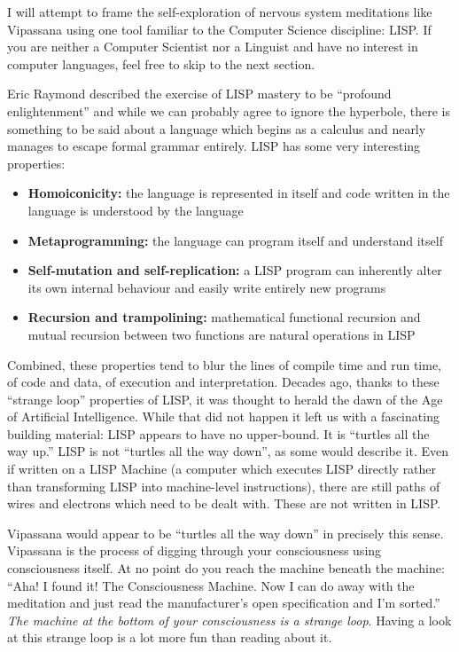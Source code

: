 \documentclass{article}
\begin{document}
I will attempt to frame the self-exploration of nervous system meditations like Vipassana using one tool familiar to the Computer Science discipline: LISP. If you are neither a Computer Scientist nor a Linguist and have no interest in computer languages, feel free to skip to the next section.

Eric Raymond described the exercise of LISP mastery to be ``profound enlightenment'' \cite{hackerhowto} and while we can probably agree to ignore the hyperbole, there is something to be said about a language which begins as a calculus and nearly manages to escape formal grammar entirely. LISP has some very interesting properties:

\begin{itemize}
\item \textbf{Homoiconicity:} the language is represented in itself and code written in the language is understood by the language
\item \textbf{Metaprogramming:} the language can program itself and understand itself
\item \textbf{Self-mutation and self-replication:} a LISP program can inherently alter its own internal behaviour and easily write entirely new programs
\item \textbf{Recursion and trampolining:} mathematical functional recursion and mutual recursion between two functions are natural operations in LISP
\end{itemize}

Combined, these properties tend to blur the lines of compile time and run time, of code and data, of execution and interpretation. Decades ago, thanks to these ``strange loop'' properties of LISP, it was thought to herald the dawn of the Age of Artificial Intelligence. While that did not happen it left us with a fascinating building material: LISP appears to have no upper-bound. It is ``turtles all the way up.'' LISP is not ``turtles all the way down'', as some would describe it. Even if written on a LISP Machine (a computer which executes LISP directly rather than transforming LISP into machine-level instructions), there are still paths of wires and electrons which need to be dealt with. These are not written in LISP.

Vipassana would appear to be ``turtles all the way down'' in precisely this sense. Vipassana is the process of digging through your consciousness using consciousness itself. At no point do you reach the machine beneath the machine: ``Aha! I found it! The Consciousness Machine. Now I can do away with the meditation and just read the manufacturer's open specification and I'm sorted.'' \textit{The machine at the bottom of your consciousness is a strange loop}. Having a look at this strange loop is a lot more fun than reading about it.
\end{document}
